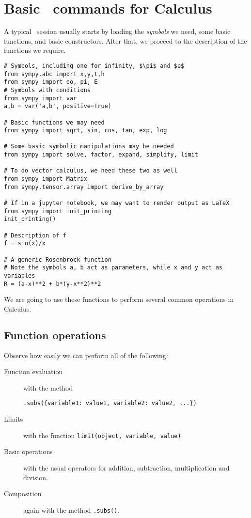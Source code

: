 
\chapter{Basic \sympy\ commands for Calculus}\label{appendix:sympy}

A typical \sympy\ session usually starts by loading the \emph{symbols} we need, some basic functions, and basic constructors.  After that, we proceed to the description of the functions we require.

\begin{verbatim}
# Symbols, including one for infinity, $\pi$ and $e$
from sympy.abc import x,y,t,h
from sympy import oo, pi, E
# Symbols with conditions
from sympy import var
a,b = var('a,b', positive=True)

# Basic functions we may need
from sympy import sqrt, sin, cos, tan, exp, log

# Some basic symbolic manipulations may be needed
from sympy import solve, factor, expand, simplify, limit

# To do vector calculus, we need these two as well
from sympy import Matrix
from sympy.tensor.array import derive_by_array

# If in a jupyter notebook, we may want to render output as LaTeX
from sympy import init_printing
init_printing()

# Description of f
f = sin(x)/x

# A generic Rosenbrock function
# Note the symbols a, b act as parameters, while x and y act as variables
R = (a-x)**2 + b*(y-x**2)**2
\end{verbatim}

We are going to use these functions to perform several common operations in Calculus.

\section{Function operations}
Observe how easily we can perform all of the following:
\begin{description}
	\item[Function evaluation] with the method 
	\begin{verbatim}.subs({variable1: value1, variable2: value2, ...})\end{verbatim}
	\item[Limits] with the function \texttt{limit(object, variable, value)}.
	\item[Basic operations] with the usual operators for addition, subtraction, multiplication and division.
	\item[Composition] again with the method \texttt{.subs()}.
\end{description}

